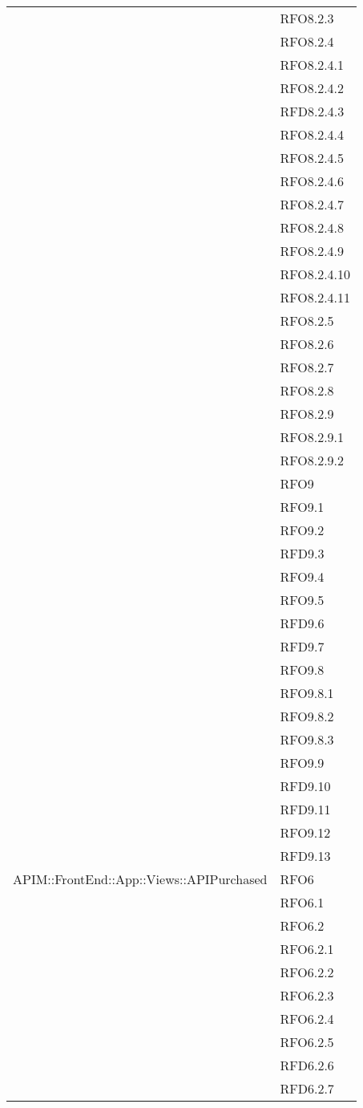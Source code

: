 \begin{longtable}{ p{12cm} | p{4cm} }
	& RFO8.2.3 \\
	& RFO8.2.4 \\
	& RFO8.2.4.1 \\
	& RFO8.2.4.2 \\
	& RFD8.2.4.3 \\
	& RFO8.2.4.4 \\
	& RFO8.2.4.5 \\
	& RFO8.2.4.6 \\
	& RFO8.2.4.7 \\
	& RFO8.2.4.8 \\
	& RFO8.2.4.9 \\
	& RFO8.2.4.10 \\
	& RFO8.2.4.11 \\
	& RFO8.2.5 \\
	& RFO8.2.6 \\
	& RFO8.2.7 \\
	& RFO8.2.8 \\
	& RFO8.2.9 \\
	& RFO8.2.9.1 \\
	& RFO8.2.9.2 \\
	& RFO9 \\
	& RFO9.1 \\
	& RFO9.2 \\
	& RFD9.3 \\
	& RFO9.4 \\
	& RFO9.5 \\
	& RFD9.6 \\
	& RFD9.7 \\
	& RFO9.8 \\
	& RFO9.8.1 \\
	& RFO9.8.2 \\
	& RFO9.8.3 \\
	& RFO9.9 \\
	& RFD9.10 \\
	& RFD9.11 \\
	& RFO9.12 \\
	& RFD9.13 \\
	\hline
	APIM::FrontEnd::App::Views::APIPurchased
	& RFO6 \\
	& RFO6.1 \\
	& RFO6.2 \\
	& RFO6.2.1 \\
	& RFO6.2.2 \\
	& RFO6.2.3 \\
	& RFO6.2.4 \\
	& RFO6.2.5 \\
	& RFD6.2.6 \\
	& RFD6.2.7 \\

\end{longtable}
